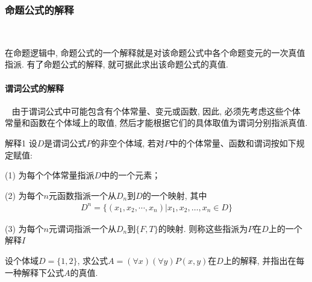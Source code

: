 \subsubsection{命题公式的解释}~{}

在命题逻辑中, 命题公式的一个解释就是对该命题公式中各个命题变元的一次真值指派. 有了命题公式的解释, 就可据此求出该命题公式的真值.
\paragraph{谓词公式的解释}~{}
由于谓词公式中可能包含有个体常量、变元或函数, 因此, 必须先考虑这些个体常量和函数在个体域上的取值, 然后才能根据它们的具体取值为谓词分别指派真值.

\begin{mydef}{解释}{1}
设$D$是谓词公式$P$的非空个体域, 若对$P$中的个体常量、函数和谓词按如下规定赋值:

(1) 为每个个体常量指派$D$中的一个元素；

(2) 为每个$n$元函数指派一个从$D_n$到$D$的一个映射, 其中
\begin{align}
  D^n =\{(x_1, x_2,\cdots, x_n)| x_1, x_2, …, x_n\in D\}
\end{align}

(3) 为每个$n$元谓词指派一个从$D_n$到$\{F, T\}$的映射.  则称这些指派为$P$在$D$上的一个解释$I$
\end{mydef}
\begin{example}
  设个体域$D=\{1, 2\}$, 求公式$A=(\forall x)( \forall y)P(x, y)$在$D$上的解释, 并指出在每一种解释下公式$A$的真值.
\end{example}
